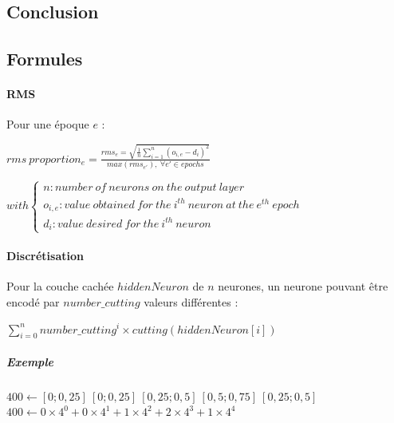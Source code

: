   \subsection*{Conclusion}
  
  

  \newpage 
  \subsection*{Formules}
    \paragraph{RMS}
      Pour une époque $e$ :
      \begin{center}
	\begin{large}
	$ rms\ proportion_{e} = \frac{ rms_{e} = \sqrt{ \frac{1}{n} \sum \limits_{i=1}^{n} 
	( o_{i,e} - d_{i} )^2 }}{max(rms_{e'}),\ \forall e' \in epochs } $
	\end{large}
      $ with \left\lbrace \begin{array}{lll} n : number\ of\ neurons\ on\ the\ output\ 
      layer\\o_{i,e} : value\ obtained\ for\ the\ i^{th}\ neuron\ at\ the\ e^{th}\ epoch\\d_{i} : 
      value\ desired \ for\ the\ i^{th}\ neuron\end{array} \right.$
      \end{center}
    \paragraph{Discrétisation} Pour la couche cachée $hiddenNeuron$ de $n$ neurones, un neurone
      pouvant être encodé par $number\_cutting$ valeurs différentes :
      \begin{center}
	$\sum \limits_{i=0}^{n} number\_cutting^{i} \times cutting(hiddenNeuron[i]) $
      \end{center}
      \subparagraph{Exemple}
	$400 \gets [0 ; 0,25 ]\ [0 ; 0,25 ]\  [0,25 ; 0,5 ]\  [0,5 ; 0,75 ]\  [0,25 ; 0,5 ]$ \\
	\hspace*{2.70cm}
	$400 \gets 0\times4^0 +   0\times4^1  +   1\times4^2   +  2\times4^3   +   1 \times4^4$
